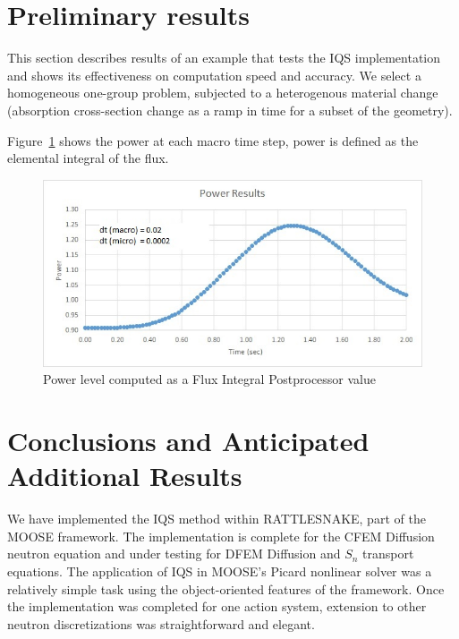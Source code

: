\documentclass[12pt]{article}
\begin{document}
%
\section{Preliminary results} 
\label{sect::results}

This section describes results of an example that tests the IQS implementation and shows its effectiveness on computation speed and accuracy.  We select a homogeneous one-group problem, subjected to a heterogenous material change (absorption cross-section change as a ramp in time for a subset of the geometry).


Figure~\ref{fig:power} shows the power at each macro time step, power is defined as the elemental integral of the flux.
\begin{figure}[!htbp]
\includegraphics[width=\linewidth]{figures/power_results.jpg}
\caption{Power level computed as a Flux Integral Postprocessor value}
\label{fig:power}
\end{figure}


%
\section{Conclusions and Anticipated Additional Results} 
\label{sect::ccl}

We have implemented the IQS method within RATTLESNAKE, part of the MOOSE framework. The
implementation is complete for the CFEM Diffusion neutron equation and under testing for
DFEM Diffusion and $S_n$ transport equations. The application of IQS in MOOSE's Picard nonlinear solver was a relatively simple task using the object-oriented features of the framework. Once the implementation was completed for one action system, extension to other neutron discretizations was straightforward and elegant.  
\end{document}
